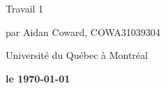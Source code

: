 \documentclass[12pt, letterpaper]{article}
\begin{document}
\begin{titlepage}
	\begin{center}



Travail 1 

par Aidan Coward, COWA31039304

Université du Québec à Montréal

\vfill
\textbf{le \today}

	\end{center}
\end{titlepage}

\begin{center}
\end{center}
\end{document}
